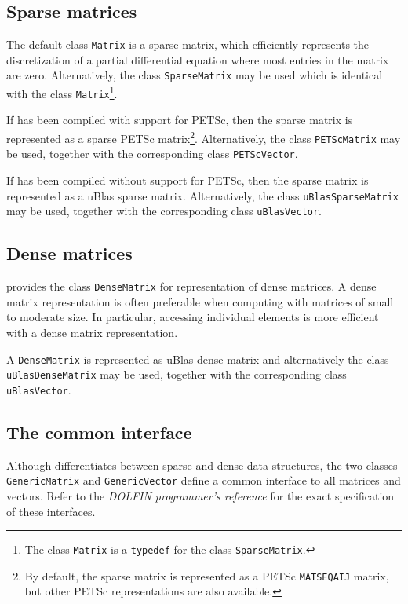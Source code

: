 \subsection{Sparse matrices}

The default \dolfin{} class \texttt{Matrix} is a sparse matrix, which
efficiently represents the discretization of a partial differential
equation where most entries in the matrix are zero. Alternatively,
the class \texttt{SparseMatrix} may be used which is identical with
the class \texttt{Matrix}\footnote{The class \texttt{Matrix} is a
\texttt{typedef} for the class \texttt{SparseMatrix}.}.

If \dolfin{} has been compiled with support for PETSc, then the sparse
matrix is represented as a sparse PETSc matrix\footnote{By default, the
sparse matrix is represented as a PETSc \texttt{MATSEQAIJ} matrix, but
other PETSc representations are also available.}. Alternatively, the
class \texttt{PETScMatrix} may be used, together with the corresponding
class \texttt{PETScVector}.

If \dolfin{} has been compiled without support for PETSc, then the
sparse matrix is represented as a uBlas sparse matrix. Alternatively,
the class \texttt{uBlasSparseMatrix} may be used, together with the
corresponding class \texttt{uBlasVector}.

\subsection{Dense matrices}

\dolfin{} provides the class \texttt{DenseMatrix} for representation
of dense matrices. A dense matrix representation is often preferable
when computing with matrices of small to moderate size. In particular,
accessing individual elements 
is more efficient with a dense matrix representation.

A \texttt{DenseMatrix} is represented as uBlas dense matrix and
alternatively the class \texttt{uBlasDenseMatrix} may be used,
together with the corresponding class \texttt{uBlasVector}.

\subsection{The common interface}

Although \dolfin{} differentiates between sparse and dense data
structures, the two classes \texttt{GenericMatrix} and
\texttt{GenericVector} define a common interface to all matrices and
vectors. Refer to the \emph{DOLFIN programmer's reference} for the
exact specification of these interfaces.

